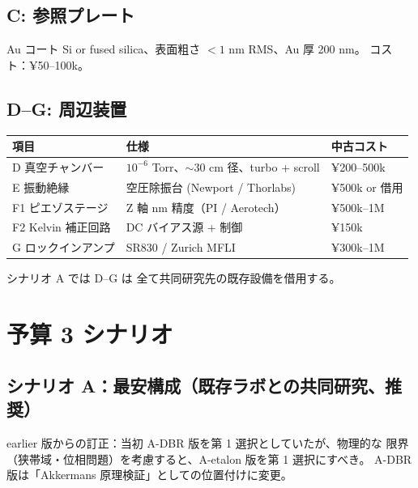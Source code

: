 \documentclass[11pt,a4paper]{article}
\def\textbf#1{#1}%
\begin{document}
\subsection{C: 参照プレート}

Au コート Si or fused silica、表面粗さ $< 1$ nm RMS、Au 厚 200 nm。
コスト：¥50--100k。

\subsection{D--G: 周辺装置}

\begin{center}
\begin{tabular}{lll}
\toprule
項目 & 仕様 & 中古コスト \\
\midrule
D 真空チャンバー    & $10^{-6}$ Torr、$\sim 30$ cm 径、turbo + scroll & ¥200--500k \\
E 振動絶縁          & 空圧除振台 (Newport / Thorlabs)              & ¥500k or 借用 \\
F1 ピエゾステージ    & Z 軸 nm 精度（PI / Aerotech）                 & ¥500k--1M \\
F2 Kelvin 補正回路   & DC バイアス源 + 制御                          & ¥150k \\
G ロックインアンプ   & SR830 / Zurich MFLI                           & ¥300k--1M \\
\bottomrule
\end{tabular}
\end{center}

シナリオ A では D--G は \textbf{全て共同研究先の既存設備を借用}する。

\newpage

\section{予算 3 シナリオ}

\subsection{シナリオ A：最安構成（既存ラボとの共同研究、推奨）}

\textbf{earlier 版からの訂正}：当初 A-DBR 版を第 1 選択としていたが、物理的な
限界（狭帯域・位相問題）を考慮すると、A-etalon 版を第 1 選択にすべき。
A-DBR 版は「Akkermans 原理検証」としての位置付けに変更。
\end{document}

